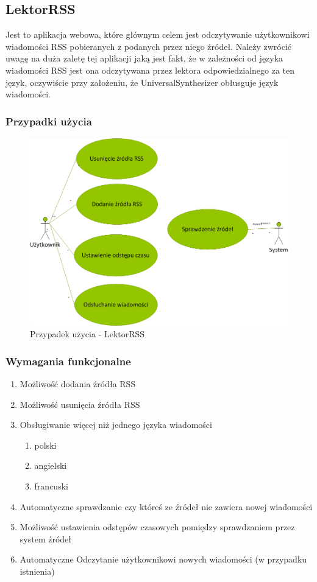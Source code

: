 \subsection{LektorRSS}
Jest to aplikacja webowa, które głównym celem jest odczytywanie użytkownikowi wiadomości RSS pobieranych z podanych przez niego źródeł. Należy zwrócić uwagę na duża zaletę tej aplikacji jaką jest fakt, że w zależności od języka wiadomości RSS jest ona odczytywana przez lektora odpowiedzialnego za ten język, oczywiście przy założeniu, że UniversalSynthesizer obłusguje język wiadomości.
\subsubsection{Przypadki użycia}
\begin{figure}[!h]
	\centering
	\includegraphics[scale=0.45]{useCaseRSS.png} 
	\caption{Przypadek użycia - LektorRSS}
\end{figure}

\subsubsection{Wymagania funkcjonalne}
\begin{enumerate}
	\item Możliwość dodania źródła RSS
	\item Możliwość usunięcia źródła RSS
	\item Obsługiwanie więcej niż jednego języka wiadomości
		\begin{enumerate}
			\item polski
			\item angielski
			\item francuski
		\end{enumerate}
	\item Automatyczne sprawdzanie czy któreś ze źródeł nie zawiera nowej wiadomości
	\item Możliwość ustawienia odstępów czasowych pomiędzy sprawdzaniem przez system źródeł
	\item Automatyczne Odczytanie użytkownikowi nowych wiadomości (w przypadku istnienia) 
\end{enumerate}  
